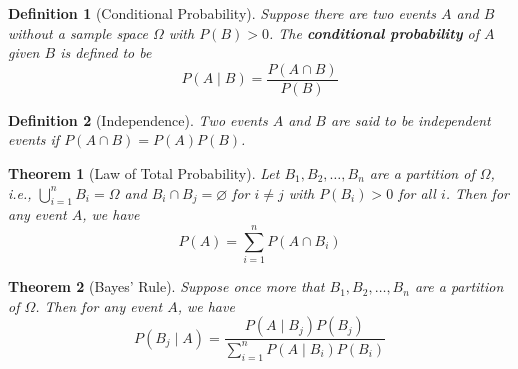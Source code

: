 \documentclass[12pt]{article}
\newtheorem{definition}{Definition}[section]
\newtheorem{theorem}{Theorem}[section]
\theoremstyle{definition}
\begin{document}
\begin{definition}[Conditional Probability]
\normalfont Suppose there are two events $A$ and $B$ without a sample space $\Omega$ with $P(B)>0$. The \textbf{conditional probability} of $A$ given $B$ is defined to be
\[
P(A\mid B) = \frac{P(A\cap B)}{P(B)}
\]
\end{definition}
\begin{definition}[Independence]
\normalfont Two events $A$ and $B$ are said to be independent events if $P(A\cap B)=P(A)P(B)$.
\end{definition}
\begin{theorem}[Law of Total Probability]
\normalfont Let $B_1, B_2, \ldots, B_n$ are a partition of $\Omega$, i.e., $\bigcup_{i=1}^n B_i=\Omega$ and $B_i\cap B_j=\varnothing$ for $i\neq j$ with $P(B_i)>0$ for all $i$. Then for any event $A$, we have
\[
P(A)=\sum_{i=1}^n P(A\cap B_i)
\]
\end{theorem}
\begin{theorem}[Bayes' Rule]
\normalfont Suppose once more that $B_1, B_2,\ldots, B_n$ are a partition of $\Omega$. Then for any event $A$, we have
\[
P(B_j\mid A) = \frac{P(A\mid B_j)P(B_j)}{\sum_{i=1}^n P(A\mid B_i)P(B_i)}
\]
\end{theorem}
\end{document}
